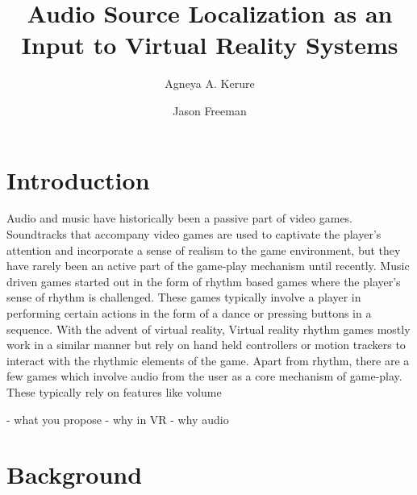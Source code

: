 \documentclass[convention]{aesconf}
\title{Audio Source Localization as an Input to Virtual Reality Systems}
\author[1]{Agneya A. Kerure}
\author[1]{Jason Freeman}
\affil[1]{Georgia Institute of Technology}
\begin{document}

\section{Introduction}
Audio and music have historically been a passive part of video games. Soundtracks that accompany video games are used to captivate the player's attention and incorporate a sense of realism to the game environment, but they have rarely been an active part of the game-play mechanism until recently.
Music driven games started out in the form of rhythm based games where the player's sense of rhythm is challenged. These games typically involve a player in performing certain actions in the form of a dance or pressing buttons in a sequence. With the advent of virtual reality, 
Virtual reality rhythm games mostly work in a similar manner but rely on hand held controllers or motion trackers to interact with the rhythmic elements of the game.
Apart from rhythm, there are a few games which involve audio from the user as a core mechanism of game-play. These typically rely on features like volume 
 
 - what you propose - why in VR - why audio
 

\section{Background}
\end{document}
